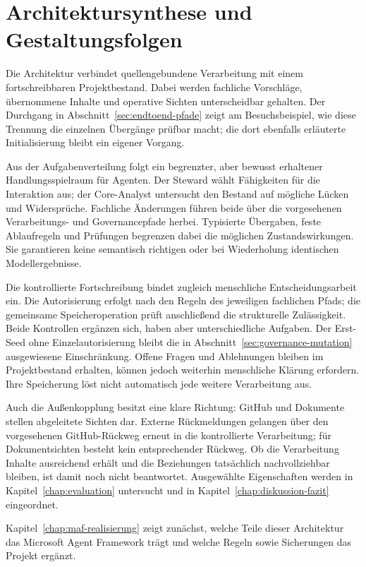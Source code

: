 
\section{Architektursynthese und Gestaltungsfolgen}
\label{sec:architektursynthese-gestaltungsfolgen}

Die Architektur verbindet quellengebundene Verarbeitung mit einem
fortschreibbaren Projektbestand. Dabei werden fachliche Vorschläge,
übernommene Inhalte und operative Sichten unterscheidbar gehalten.
Der Durchgang in Abschnitt~\ref{sec:endtoend-pfade} zeigt am
Besuchsbeispiel, wie diese Trennung die einzelnen Übergänge prüfbar
macht; die dort ebenfalls erläuterte Initialisierung bleibt ein
eigener Vorgang.

Aus der Aufgabenverteilung folgt ein begrenzter, aber bewusst
erhaltener Handlungsspielraum für Agenten. Der Steward wählt
Fähigkeiten für die Interaktion aus; der Core-Analyst untersucht den
Bestand auf mögliche Lücken und Widersprüche. Fachliche Änderungen
führen beide über die vorgesehenen Verarbeitungs- und Governancepfade
herbei. Typisierte Übergaben, feste Ablaufregeln und Prüfungen
begrenzen dabei die möglichen Zustandswirkungen. Sie garantieren
keine semantisch richtigen oder bei Wiederholung identischen
Modellergebnisse.

Die kontrollierte Fortschreibung bindet zugleich menschliche
Entscheidungsarbeit ein. Die Autorisierung erfolgt nach den Regeln
des jeweiligen fachlichen Pfads; die gemeinsame Speicheroperation
prüft anschließend die strukturelle Zulässigkeit. Beide Kontrollen
ergänzen sich, haben aber unterschiedliche Aufgaben. Der Erst-Seed
ohne Einzelautorisierung bleibt die in
Abschnitt~\ref{sec:governance-mutation} ausgewiesene Einschränkung.
Offene Fragen und Ablehnungen bleiben im Projektbestand erhalten,
können jedoch weiterhin menschliche Klärung erfordern. Ihre
Speicherung löst nicht automatisch jede weitere Verarbeitung aus.

Auch die Außenkopplung besitzt eine klare Richtung: GitHub und
Dokumente stellen abgeleitete Sichten dar. Externe Rückmeldungen
gelangen über den vorgesehenen GitHub-Rückweg erneut in die
kontrollierte Verarbeitung; für Dokumentsichten besteht kein
entsprechender Rückweg. Ob die Verarbeitung Inhalte ausreichend
erhält und die Beziehungen tatsächlich nachvollziehbar bleiben,
ist damit noch nicht beantwortet. Ausgewählte Eigenschaften werden
in Kapitel~\ref{chap:evaluation} untersucht und in
Kapitel~\ref{chap:diskussion-fazit} eingeordnet.

Kapitel~\ref{chap:maf-realisierung} zeigt zunächst, welche Teile
dieser Architektur das Microsoft Agent Framework trägt und welche
Regeln sowie Sicherungen das Projekt ergänzt.
